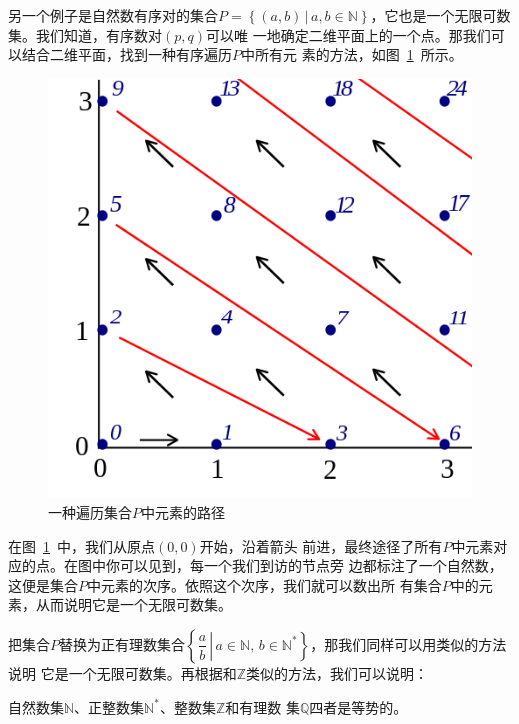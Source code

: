 另一个例子是自然数有序对的集合$P=\left\{ \left( a,b \right) \,|\, a,b\in\mathbb{N} 
\right\} $，它也是一个无限可数集。我们知道，有序数对$\left( p,q \right) $可以唯
一地确定二维平面上的一个点。那我们可以结合二维平面，找到一种有序遍历$P$中所有元
素的方法，如图~\ref{fig:pairing_natural}~所示。

\begin{figure}[H]
    \centering
    \includegraphics[width=0.5\linewidth]{fig/pairing_natural.png}
    \caption{一种遍历集合$P$中元素的路径}\label{fig:pairing_natural}
\end{figure}

在图~\ref{fig:pairing_natural}~中，我们从原点$\left( 0,0 \right) $开始，沿着箭头
前进，最终途径了所有$P$中元素对应的点。在图中你可以见到，每一个我们到访的节点旁
边都标注了一个自然数，这便是集合$P$中元素的次序。依照这个次序，我们就可以数出所
有集合$P$中的元素，从而说明它是一个无限可数集。

把集合$P$替换为正有理数集合$\left\{\left. \dfrac{a}{b}\,\right|\, a\in 
\mathbb{N},\,b\in\mathbb{N}^\ast \right\} $，那我们同样可以用类似的方法说明
它是一个无限可数集。再根据和$\mathbb{Z}$类似的方法，我们可以说明：

\begin{rawthm}
    自然数集$\mathbb{N}$、正整数集$\mathbb{N}^\ast$、整数集$\mathbb{Z}$和有理数
    集$\mathbb{Q}$四者是等势的。
\end{rawthm}


